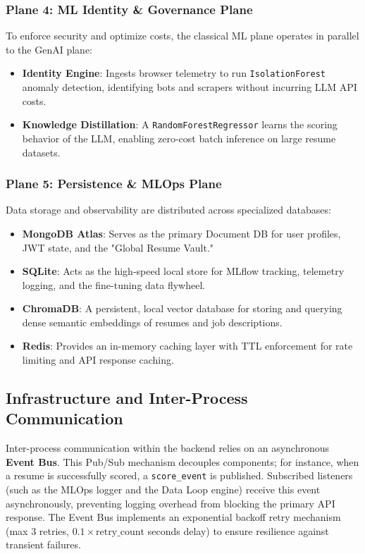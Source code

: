 \documentclass[10pt,journal,compsoc]{IEEEtran}
\begin{document}
\subsubsection{Plane 4: ML Identity \& Governance Plane}
To enforce security and optimize costs, the classical ML plane operates in parallel to the GenAI plane:
\begin{itemize}
    \item \textbf{Identity Engine}: Ingests browser telemetry to run \texttt{IsolationForest} anomaly detection, identifying bots and scrapers without incurring LLM API costs.
    \item \textbf{Knowledge Distillation}: A \texttt{RandomForestRegressor} learns the scoring behavior of the LLM, enabling zero-cost batch inference on large resume datasets.
\end{itemize}

\subsubsection{Plane 5: Persistence \& MLOps Plane}
Data storage and observability are distributed across specialized databases:
\begin{itemize}
    \item \textbf{MongoDB Atlas}: Serves as the primary Document DB for user profiles, JWT state, and the "Global Resume Vault."
    \item \textbf{SQLite}: Acts as the high-speed local store for MLflow tracking, telemetry logging, and the fine-tuning data flywheel.
    \item \textbf{ChromaDB}: A persistent, local vector database for storing and querying dense semantic embeddings of resumes and job descriptions.
    \item \textbf{Redis}: Provides an in-memory caching layer with TTL enforcement for rate limiting and API response caching.
\end{itemize}

\subsection{Infrastructure and Inter-Process Communication}
Inter-process communication within the backend relies on an asynchronous \textbf{Event Bus}. This Pub/Sub mechanism decouples components; for instance, when a resume is successfully scored, a \texttt{score\_event} is published. Subscribed listeners (such as the MLOps logger and the Data Loop engine) receive this event asynchronously, preventing logging overhead from blocking the primary API response. The Event Bus implements an exponential backoff retry mechanism (max 3 retries, $0.1 \times \text{retry\_count}$ seconds delay) to ensure resilience against transient failures.
\end{document}
